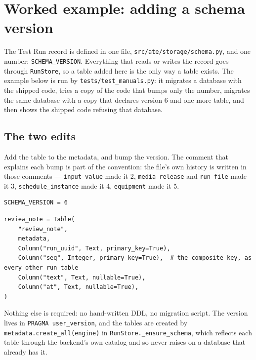 \chapter{Worked example: adding a schema version}\label{ch:schema-version}

The Test Run record is defined in one file, \texttt{src/\allowbreak{}ate/\allowbreak{}storage/\allowbreak{}schema.py}, and one number:
\texttt{SCHEMA\_VERSION}. Everything that reads or writes the record goes through
\texttt{RunStore}, so a table added here is the only way a table exists. The example below is run by
\texttt{tests/\allowbreak{}test\_\allowbreak{}manuals.py}: it migrates a database with the shipped code,
tries a copy of the code that bumps only the number, migrates the same database with a copy that
declares version 6 and one more table, and then shows the shipped code refusing that database.

\section{The two edits}

Add the table to the metadata, and bump the version. The comment that explains each bump is part of
the convention: the file's own history is written in those comments --- \texttt{input\_value} made it
2, \texttt{media\_release} and \texttt{run\_file} made it 3, \texttt{schedule\_instance} made it 4,
\texttt{equipment} made it 5.

\begin{lstlisting}[language=ATEPython]
SCHEMA_VERSION = 6
\end{lstlisting}

\begin{lstlisting}[language=ATEPython]
review_note = Table(
    "review_note",
    metadata,
    Column("run_uuid", Text, primary_key=True),
    Column("seq", Integer, primary_key=True),  # the composite key, as every other run table
    Column("text", Text, nullable=True),
    Column("at", Text, nullable=True),
)
\end{lstlisting}

Nothing else is required: no hand-written DDL, no migration script. The version lives in
\texttt{PRAGMA user\_version}, and the tables are created by
\texttt{metadata.create\_\allowbreak{}all(engine)} in \texttt{RunStore.\_\allowbreak{}ensure\_\allowbreak{}schema}, which reflects each
table through the backend's own catalog and so never raises on a database that already has it.

